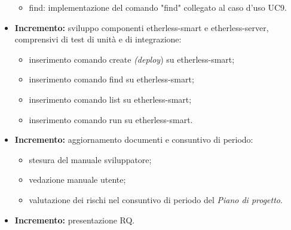 \begin{itemize}
\begin{itemize}
    \item find: implementazione del comando "find" collegato al caso d'uso UC9.
  \end{itemize}
	\item \textbf{ Incremento:} sviluppo componenti etherless-smart e etherless-server, comprensivi di test di unità e di integrazione:
	\begin{itemize}
		\item inserimento comando create \textit{(deploy}\glo) su etherless-smart;
		\item inserimento comando find su etherless-smart;
		\item inserimento comando list su etherless-smart;
		\item inserimento comando run su etherless-smart.
	\end{itemize}
	\item \textbf{ Incremento:} aggiornamento documenti e consuntivo di periodo:
  \begin{itemize}
  	\item stesura del manuale sviluppatore;
    \item vedazione manuale utente;
    \item valutazione dei rischi nel consuntivo di periodo del \textit{Piano di progetto}\docs.
  \end{itemize}
	\item \textbf{ Incremento:} presentazione RQ.
\end{itemize}
